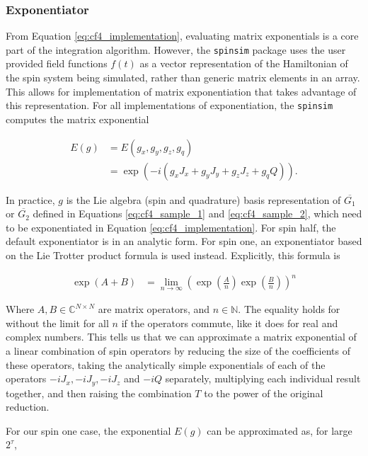 \documentclass{jors}
\begin{document}
		\subsubsection{Exponentiator}
			From Equation \eqref{eq:cf4_implementation}, evaluating matrix exponentials is a core part of the integration algorithm. However, the \texttt{spinsim} package uses the user provided field functions \(f(t)\) as a vector representation of the Hamiltonian of the spin system being simulated, rather than generic matrix elements in an array. This allows for implementation of matrix exponentiation that takes advantage of this representation. For all implementations of exponentiation, the \texttt{spinsim} computes the matrix exponential
			
			\begin{align}
				E(g) &= E(g_x, g_y, g_z, g_q)\\
				&= \exp(-i (g_x J_x + g_y J_y + g_z J_z + g_q Q)).
			\end{align}
			
			In practice, \(g\) is the Lie algebra (spin and quadrature) basis representation of \(\overline{G_1}\) or \(\overline{G_2}\) defined in Equations \eqref{eq:cf4_sample_1} and \eqref{eq:cf4_sample_2}, which need to be exponentiated in Equation \eqref{eq:cf4_implementation}. For spin half, the default exponentiator is in an analytic form. For spin one, an exponentiator based on the Lie Trotter product formula \cite{moler_nineteen_2003} is used instead. Explicitly, this formula is
			
			\begin{align}
				\exp\left( A + B\right) &= \lim_{n\to\infty} \left(\exp\left(\frac{A}{n}\right) \exp\left(\frac{B}{n}\right)\right)^n
			\end{align}
			
			Where \(A,B\in\mathbb{C}^{N\times N}\) are matrix operators, and \(n\in\mathbb{N}\). The equality holds for without the limit for all \(n\) if the operators commute, like it does for real and complex numbers. This tells us that we can approximate a matrix exponential of a linear combination of spin operators by reducing the size of the coefficients of these operators, taking the analytically simple exponentials of each of the operators \(-iJ_x, -iJ_y, -iJ_z\) and \(-iQ\) separately, multiplying each individual result together, and then raising the combination \(T\) to the power of the original reduction.
			
			For our spin one case, the exponential \(E(g)\) can be approximated as, for large \(2^\tau\),
\end{document}
